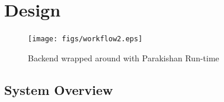 \section{Design}
\label{sec:design}


\begin{figure}[t]
  \begin{center}
    \texttt{[image: figs/workflow2.eps]}
    \caption{Backend wrapped around with Parakishan Run-time}
    \label{fig:workflow}
  \end{center}
\end{figure}



\subsection{System Overview}
\label{sec:systemOverview}

